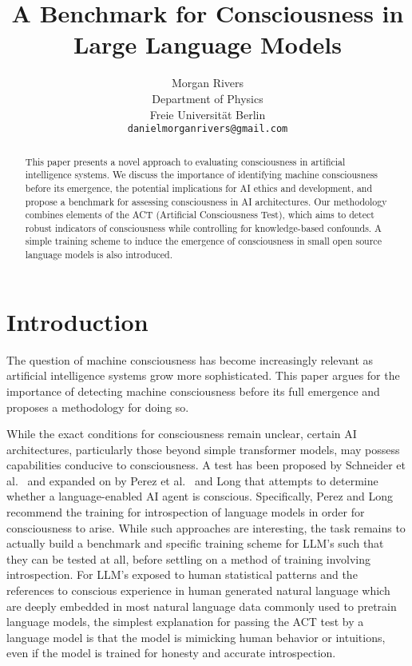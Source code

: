 \documentclass{article}
\title{A Benchmark for Consciousness in Large Language Models}
\author{Morgan Rivers \\
        Department of Physics \\
        Freie Universität Berlin \\    
        \texttt{danielmorganrivers@gmail.com}
}
\begin{document}
\maketitle

\begin{abstract}
This paper presents a novel approach to evaluating consciousness in artificial intelligence systems. We discuss the importance of identifying machine consciousness before its emergence, the potential implications for AI ethics and development, and propose a benchmark for assessing consciousness in AI architectures. Our methodology combines elements of the ACT (Artificial Consciousness Test), which aims to detect robust indicators of consciousness while controlling for knowledge-based confounds. A simple training scheme to induce the emergence of consciousness in small open source language models is also introduced.
\end{abstract}

\section{Introduction}

The question of machine consciousness has become increasingly relevant as artificial intelligence systems grow more sophisticated. This paper argues for the importance of detecting machine consciousness before its full emergence and proposes a methodology for doing so.

While the exact conditions for consciousness remain unclear, certain AI architectures, particularly those beyond simple transformer models, may possess capabilities conducive to consciousness. A test has been proposed by Schneider et al.\ \citep{turner2018testing} and expanded on by Perez et al.\ \citep{perez2023evaluatingaisystemsmoral} and Long \citep{long2023introspective} that attempts to determine whether a language-enabled AI agent is conscious. Specifically, Perez and Long recommend the training for introspection of language models in order for consciousness to arise. While such approaches are interesting, the task remains to actually build a benchmark and specific training scheme for LLM's such that they can be tested at all, before settling on a method of training involving introspection. For LLM's exposed to human statistical patterns and the references to conscious experience in human generated natural language which are deeply embedded in most natural language data commonly used to pretrain language models, the simplest explanation for passing the ACT test by a language model is that the model is mimicking human behavior or intuitions, even if the model is trained for honesty and accurate introspection.
\end{document}

